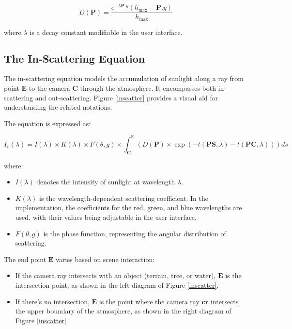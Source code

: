 \begin{equation}
    D(\mathbf{P})=\frac{e^{-\lambda \mathbf{P}.y}\left(h_{\text{max}}-\mathbf{P}.y\right)}{h_{\text{max}}}
\end{equation}

where $\lambda$ is a decay constant modifiable in the user interface.

\subsection{The In-Scattering Equation}
\label{The In-Scattering Equation}

The in-scattering equation models the accumulation of sunlight along a ray from point $\mathbf{E}$ to the camera $\mathbf{C}$ through the atmosphere. It encompasses both in-scattering and out-scattering. Figure \ref{inscatter} provides a visual aid for understanding the related notations.

The equation is expressed as:

\begin{equation}
    I_v(\lambda) = I(\lambda) \times K(\lambda) \times F(\theta, g) \times \int_{\mathbf{C}}^{\mathbf{E}} \left( D(\mathbf{P}) \times \exp\left(-t\left({{\mathbf{PS}},\lambda}\right) -t \left({{\mathbf{PC}},\lambda}\right) \right)\right) ds
\end{equation}

where:
\begin{itemize}
    \item $I(\lambda)$ denotes the intensity of sunlight at wavelength $\lambda$.
    \item $K(\lambda)$ is the wavelength-dependent scattering coefficient. In the implementation, the coefficients for the red, green, and blue wavelengths are used, with their values being adjustable in the user interface.
    \item $F(\theta, g)$ is the phase function, representing the angular distribution of scattering.
\end{itemize}

The end point $\mathbf{E}$ varies based on scene interaction:
\begin{itemize}
    \item If the camera ray intersects with an object (terrain, tree, or water), $\mathbf{E}$ is the intersection point, as shown in the left diagram of Figure \ref{inscatter}.
    \item If there's no intersection, $\mathbf{E}$ is the point where the camera ray $\mathbf{cr}$ intersects the upper boundary of the atmosphere, as shown in the right diagram of Figure \ref{inscatter}.
\end{itemize}

